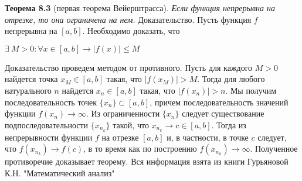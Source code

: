 \textbf{Теорема 8.3} (первая теорема Вейерштрасса). \textit{Если
функция непрерывна на отрезке, то она ограничена на
нем.}
\newline \indent Доказательство. Пусть функция $f$ непрерывна на
$[a, b]$. Необходимо доказать, что
\newline
\newline
\centerline{$\exists \: M>0 : \forall x \in [a, b] \rightarrow |f(x)| \leq M$}
\newline
\newline
Доказательство проведем методом от противного. Пусть
для каждого $M > 0$ найдется точка $x_M \in [a, b]$ такая, что
$|f(x_M)| > M$. Тогда для любого натурального $n$ найдется
$x_n \in [a, b]$ такая, что $|f(x_n)| > n$. Мы получим последовательность точек $\{x_n\} \subset [a, b]$, причем последовательность
значений функции $f(x_n) \rightarrow \infty$. Из ограниченности $\{x_n\}$
следует существование подпоследовательности $\{x_{n_k}\}$ такой, что $x_{n_k} \rightarrow c \in [a, b]$. Тогда из непрерывности функции
$f$ на отрезке $[a, b]$ и, в частности, в точке $c$ следует, что
$f(x_{n_k}) \rightarrow f(c)$, в то время как по построению $f(x_{n_k}) \rightarrow \infty$.
Полученное противоречие доказывает теорему.
\newline
\indent
Вся информация взята из книги Гурьяновой К.Н. "Математический анализ" \cite{matan}
\newpage
